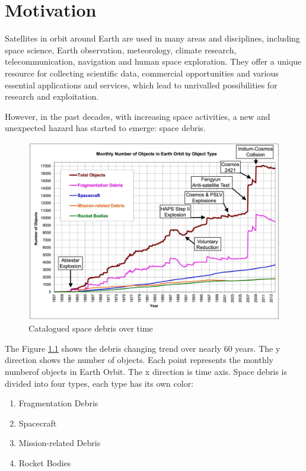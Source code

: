 \chapter{Motivation}\label{sec-motivation}

Satellites in orbit around Earth are used in many areas and disciplines, including space science, Earth observation, meteorology, climate research, telecommunication, navigation and human space exploration. They offer a unique resource for collecting scientific data, commercial opportunities and various essential applications and services, which lead to unrivalled possibilities for research and exploitation.

However, in the past decades, with increasing space activities, a new and unexpected hazard has started to emerge: space debris.

\begin{figure}[ht]
\centering
\includegraphics[width=1\textwidth]{fig/motivation/CataloguedSpaceDebrisOverTime}
\caption{Catalogued space debris over time\cite{wright2010current}}
\label{moti-CataloguedSpaceDebrisOverTime}
\end{figure}

The Figure \ref{moti-CataloguedSpaceDebrisOverTime} shows the debris changing trend over nearly 60 years. The y direction shows the number of objects. Each point represents the monthly numberof objects in Earth Orbit. The x direction is time axis. Space debris is divided into four types, each type has its own color: 
\begin{enumerate}
\item{Fragmentation Debris}
\item{Spacecraft}
\item{Mission-related Debris}
\item{Rocket Bodies}
\end{enumerate}


